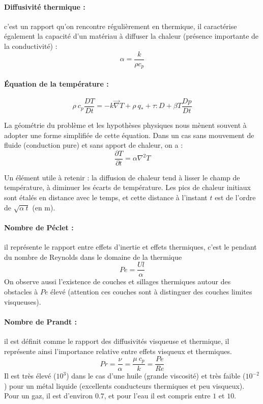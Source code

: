 \paragraph{Diffusivité thermique :}c'est un rapport qu'on rencontre régulièrement en thermique, il caractérise également la capacité d'un matériau à diffuser la chaleur (présence importante de la conductivité) :
%
\begin{equation}
\alpha = \frac{k}{\rho c_p}
\end{equation}


\paragraph{Équation de la température :}
%
\begin{equation}
\rho~c_p \frac{DT}{Dt}
= - k \vec{\nabla} T
+ \rho~q_*
+ \tau:D
+ \beta T\frac{Dp}{Dt}
\end{equation}

La géométrie du problème et les hypothèses physiques nous mènent souvent à adopter une forme simplifiée de cette équation. Dans un cas sans mouvement de fluide (conduction pure) et sans apport de chaleur, on a :
%
\begin{equation}
\frac{\partial T}{\partial t}
= \alpha \nabla^2 T
\end{equation}

Un élément utile à retenir : la diffusion de chaleur tend à lisser le champ de température, à diminuer les écarts de température. Les pics de chaleur initiaux sont étalés en distance avec le temps, et cette distance à l'instant $t$ est de l'ordre de $\sqrt{\alpha~t}$ (en m).


\paragraph{Nombre de Péclet :}il représente le rapport entre effets d'inertie et effets thermiques, c'est le pendant du nombre de Reynolds dans le domaine de la thermique
%
\begin{equation}
Pe = \frac{Ul}{\alpha}
\end{equation}
%
On observe aussi l'existence de couches et sillages thermiques autour des obstacles à $Pe$ élevé (attention ces couches sont à distinguer des couches limites visqueuses).

\paragraph{Nombre de Prandt :}il est définit comme le rapport des diffusivités visqueuse et thermique, il représente ainsi l'importance relative entre effets visqueux et thermiques.
%
\begin{equation}
Pr = \frac{\nu}{\alpha} = \frac{\mu~c_p}{k} = \frac{Pe}{Re}
\end{equation}
%
Il est très élevé ($10^3$) dans le cas d'une huile (grande viscosité) et très faible ($10^{-2}$) pour un métal liquide (excellents conducteurs thermiques et peu visqueux). Pour un gaz, il est d'environ $0.7$, et pour l'eau il est compris entre $1$ et $10$.

